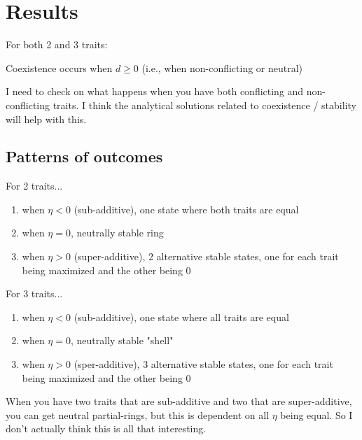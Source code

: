 \section*{Results}



For both 2 and 3 traits:

Coexistence occurs when $d \ge 0$ (i.e., when non-conflicting or neutral)

I need to check on what happens when you have both conflicting and non-conflicting
traits.
I think the analytical solutions related to coexistence / stability will
help with this.



\subsection*{Patterns of outcomes}

For 2 traits...

\begin{enumerate}
    \item when $\eta < 0$ (sub-additive), one state where both traits are equal
    \item when $\eta = 0$, neutrally stable ring
    \item when $\eta > 0$ (super-additive), 2 alternative stable states, one for each trait being
        maximized and the other being 0
\end{enumerate}

%


For 3 traits...

\begin{enumerate}
    \item when $\eta < 0$ (sub-additive), one state where all traits are equal
    \item when $\eta = 0$, neutrally stable "shell"
    \item when $\eta > 0$ (sper-additive), 3 alternative stable states,
        one for each trait being maximized and the other being 0
\end{enumerate}

When you have two traits that are sub-additive and two that are super-additive, you
can get neutral partial-rings, but this is dependent on all $\eta$ being equal.
So I don't actually think this is all that interesting.

